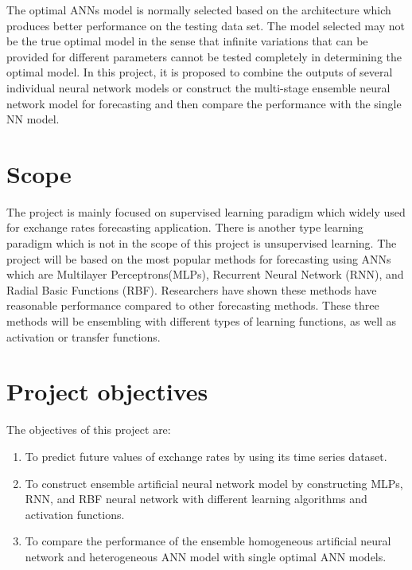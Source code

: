 The optimal ANNs model is normally selected based on the architecture which produces better performance on the testing data set. The model selected may not be the true optimal model in the sense that infinite variations that can be provided for different parameters cannot be tested completely in determining the optimal model. In this project, it is proposed to combine the outputs of several individual neural network models or construct the multi-stage ensemble neural network model for forecasting and then compare the performance with the single NN model.

\section{Scope}
The project is mainly focused on supervised learning paradigm which widely used for exchange rates forecasting application. There is another type learning paradigm which is not in the scope of this project is unsupervised learning. The project will be based on the most popular methods for forecasting using ANNs which are  Multilayer Perceptrons(MLPs), Recurrent Neural Network (RNN), and Radial Basic Functions (RBF). Researchers have shown these methods have reasonable performance compared to other forecasting methods. These three methods will be ensembling  with different types of learning functions, as well as activation or transfer functions.
\section{Project objectives }
The objectives of this project are: 
\begin{enumerate}
	\item To predict  future values of exchange rates by using its time series dataset.
	\item To  construct  ensemble artificial  neural network model by constructing  MLPs, RNN, and RBF neural network with different learning algorithms and activation functions.
	\item To compare the performance of the ensemble homogeneous artificial neural network and heterogeneous ANN model with single optimal ANN models.
\end{enumerate}

